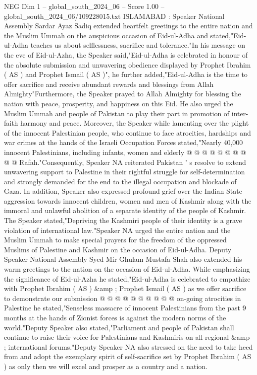 \begin{textsample}{NEG Dim 1 – global\_south\_2024\_06 – Score 1.00 – global\_south\_2024\_06/109228015.txt}  \label{ex:f1_neg_405}
ISLAMABAD : Speaker National Assembly Sardar Ayaz Sadiq extended heartfelt greetings to the entire nation and the Muslim Ummah on the auspicious occasion of Eid-ul-Adha and stated,"Eid-ul-Adha teaches us about selflessness, sacrifice and tolerance."In his message on the eve of Eid-ul-Azha, the Speaker said,"Eid-ul-Adha is celebrated in honour of the absolute submission and unwavering obedience displayed by Prophet Ibrahim ( AS ) and Prophet Ismail ( AS )", he further added,"Eid-ul-Adha is the time to offer sacrifice and receive abundant rewards and blessings from Allah Almighty"Furthermore, the Speaker prayed to Allah Almighty for blessing the nation with peace, prosperity, and happiness on this Eid.
He also urged the Muslim Ummah and people of Pakistan to play their part in promotion of inter-faith harmony and peace.
Moreover, the Speaker while lamenting over the plight of the innocent Palestinian people, who continue to face atrocities, hardships and war crimes at the hands of the Israeli Occupation Forces stated,"Nearly 40,000 innocent Palestinians, including infants, women and elderly @ @ @ @ @ @ @ @ @ @ Rafah."Consequently, Speaker NA reiterated Pakistan ' s resolve to extend unwavering support to Palestine in their rightful struggle for self-determination and strongly demanded for the end to the illegal occupation and blockade of Gaza.
In addition, Speaker also expressed profound grief over the Indian State aggression towards innocent children, women and men of Kashmir along with the immoral and unlawful abolition of a separate identity of the people of Kashmir.
The Speaker stated,"Depriving the Kashmiri people of their identity is a grave violation of international law."Speaker NA urged the entire nation and the Muslim Ummah to make special prayers for the freedom of the oppressed Muslims of Palestine and Kashmir on the occasion of Eid-ul-Adha.
Deputy Speaker National Assembly Syed Mir Ghulam Mustafa Shah also extended his warm greetings to the nation on the occasion of Eid-ul-Adha.
While emphasizing the significance of Eid-ul-Azha he stated,"Eid-ul-Adha is celebrated to empathize with Prophet Ibrahim ( AS ) \&amp ; Prophet Ismail ( AS ) as we offer sacrifice to demonstrate our submission @ @ @ @ @ @ @ @ @ @ on-going atrocities in Palestine he stated,"Senseless massacre of innocent Palestinians from the past 9 months at the hands of Zionist forces is against the modern norms of the world."Deputy Speaker also stated,"Parliament and people of Pakistan shall continue to raise their voice for Palestinians and Kashmiris on all regional \&amp ; international forums."Deputy Speaker NA also stressed on the need to take heed from and adopt the exemplary spirit of self-sacrifice set by Prophet Ibrahim ( AS ) as only then we will excel and prosper as a country and a nation.

\end{textsample}
